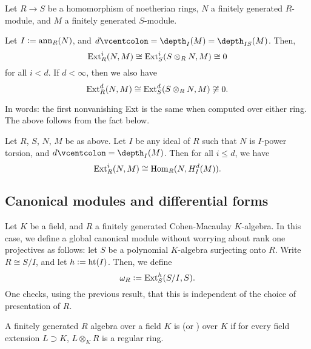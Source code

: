 \documentclass[12pt]{article}
\begin{document}
\begin{thm}
	Let $R \to S$ be a homomorphism of noetherian rings, $N$ a finitely generated $R$-module, and $M$ a finitely generated $S$-module. 

	Let $I \vcentcolon= \operatorname{ann}_{R}(N)$, and $d \vcentcolon= \depth_{I}(M) = \depth_{IS}(M)$. Then,
	\begin{equation*} 
		\operatorname{Ext}_{R}^{i}(N, M) \cong \operatorname{Ext}_{S}^{i}(S \otimes_{R} N, M) \cong 0
	\end{equation*}
	for all $i < d$. If $d < \infty$, then we also have
	\begin{equation*} 
		\operatorname{Ext}_{R}^{d}(N, M) \cong \operatorname{Ext}_{S}^{d}(S \otimes_{R} N, M) \not\cong 0.
	\end{equation*}
\end{thm}
In words: the first nonvanishing Ext is the same when computed over either ring. The above follows from the fact below.

\begin{prop}
	Let $R$, $S$, $N$, $M$ be as above. Let $I$ be any ideal of $R$ such that $N$ is $I$-power torsion, and $d \vcentcolon= \depth_{I}(M)$. Then for all $i \le d$, we have
	\begin{equation*} 
		\operatorname{Ext}_{R}^{i}(N, M) \cong \operatorname{Hom}_{R}(N, H_{I}^{d}(M)).
	\end{equation*}
\end{prop}

\subsection{Canonical modules and differential forms}

Let $K$ be a field, and $R$ a finitely generated Cohen-Macaulay $K$-algebra. In this case, we define a global canonical module without worrying about rank one projectives as follows: let $S$ be a polynomial $K$-algebra surjecting onto $R$. Write $R \cong S/I$, and let $h \vcentcolon= \operatorname{ht}(I)$. Then, we define
\begin{equation*} 
	\omega_{R} \vcentcolon= \operatorname{Ext}_{S}^{h}(S/I, S).
\end{equation*}
One checks, using the previous result, that this is independent of the choice of presentation of $R$.

\begin{defn}
	A finitely generated $R$ algebra over a field $K$ is  (or ) over $K$ if for every field extension $L \supset K$, $L \otimes_{K} R$ is a regular ring.
\end{defn}
\end{document}
